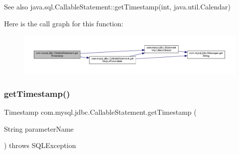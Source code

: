 \begin{DoxySeeAlso}{See also}
java.\+sql.\+Callable\+Statement\+::get\+Timestamp(int, java.\+util.\+Calendar) 
\end{DoxySeeAlso}
Here is the call graph for this function\+:\nopagebreak
\begin{figure}[H]
\begin{center}
\leavevmode
\includegraphics[width=350pt]{classcom_1_1mysql_1_1jdbc_1_1_callable_statement_a66ee1944b2e584b14ae505fccda376e7_cgraph}
\end{center}
\end{figure}
\mbox{\label{classcom_1_1mysql_1_1jdbc_1_1_callable_statement_ac7c3faa6bd8c91104870d6ae4dc25916}} 
\subsubsection{\texorpdfstring{get\+Timestamp()}{getTimestamp()}\hspace{0.1cm}{\footnotesize\ttfamily [3/4]}}
{\footnotesize\ttfamily Timestamp com.\+mysql.\+jdbc.\+Callable\+Statement.\+get\+Timestamp (\begin{DoxyParamCaption}\item[{String}]{parameter\+Name }\end{DoxyParamCaption}) throws S\+Q\+L\+Exception}

